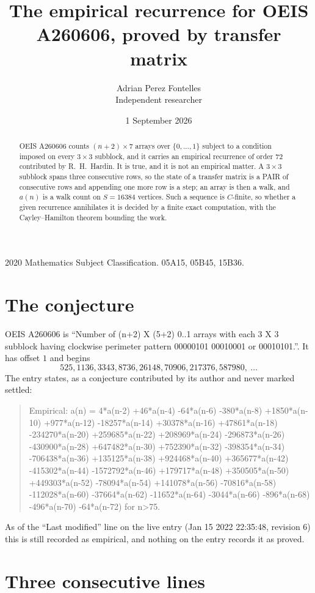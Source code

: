 \documentclass[11pt,a4paper]{article}
\title{The empirical recurrence for OEIS A260606, proved by transfer matrix}
\author{Adrian Perez Fontelles\\ \small Independent researcher}
\date{1 September 2026}
\theoremstyle{plain}
\theoremstyle{definition}
\begin{document}
\maketitle

\begin{abstract}
OEIS A260606 counts $(n+2)\times7$ arrays over $\{0,\dots,1\}$ subject to a condition imposed on
every $3\times3$ subblock, and it carries an empirical recurrence of order $72$
contributed by R.~H.~Hardin. It is true, and it is not an empirical matter. A $3\times3$
subblock spans three consecutive rows, so the state of a transfer matrix is a PAIR of
consecutive rows and appending one more row is a step; an array is then a walk, and
$a(n)$ is a walk count on $S=16384$ vertices. Such a sequence is $C$-finite, so whether a given
recurrence annihilates it is decided by a finite exact computation, with the Cayley--Hamilton
theorem bounding the work.
\end{abstract}

\noindent\small 2020 Mathematics Subject Classification. 05A15, 05B45, 15B36.\normalsize

\section{The conjecture}

OEIS A260606 is ``Number of (n+2) X (5+2) 0..1 arrays with each 3 X 3 subblock having clockwise perimeter pattern 00000101 00010001 or 00010101.''. It has offset $1$ and begins
\[
525, 1136, 3343, 8736, 26148, 70906, 217376, 587980,\ \dots
\]
The entry states, as a conjecture contributed by its author and never marked settled:
\begin{quote}
Empirical: a(n) = 4*a(n-2) +46*a(n-4) -64*a(n-6) -380*a(n-8) +1850*a(n-10) +977*a(n-12) -18257*a(n-14) +30378*a(n-16) +47861*a(n-18) -234270*a(n-20) +259685*a(n-22) +208969*a(n-24) -296873*a(n-26) -430900*a(n-28) +647482*a(n-30) +752390*a(n-32) -398354*a(n-34) -706438*a(n-36) +135125*a(n-38) +924468*a(n-40) +365677*a(n-42) -415302*a(n-44) -1572792*a(n-46) +179717*a(n-48) +350505*a(n-50) +449303*a(n-52) -78094*a(n-54) +141078*a(n-56) -70816*a(n-58) -112028*a(n-60) -37664*a(n-62) -11652*a(n-64) -3044*a(n-66) -896*a(n-68) -496*a(n-70) -64*a(n-72) for n>75.
\end{quote}
As of the ``Last modified'' line on the live entry (Jan 15 2022 22:35:48, revision 6) this is still
recorded as empirical, and nothing on the entry records it as proved.

\section{Three consecutive lines}
\end{document}
